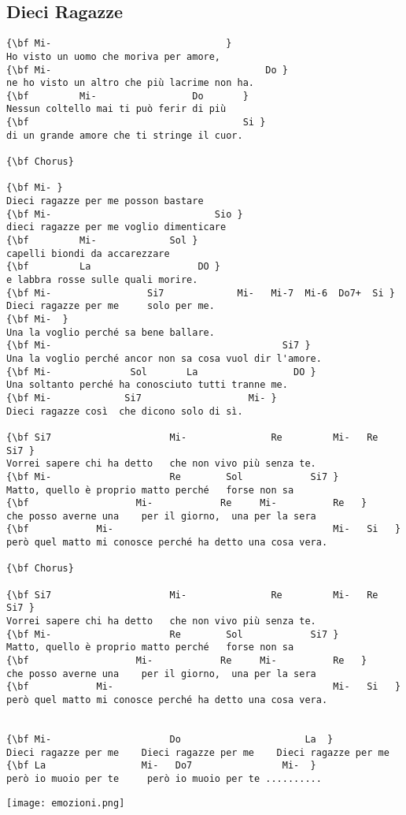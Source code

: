 \documentclass[a4paper]{article}
\begin{document}
\subsection{Dieci Ragazze} %
\label{sub:Dieci Ragazze}
\begin{Verbatim}[commandchars=\\\{\}]
{\bf Mi-                               }
Ho visto un uomo che moriva per amore, 
{\bf Mi-                                      Do }
ne ho visto un altro che più lacrime non ha. 
{\bf         Mi-                 Do       }
Nessun coltello mai ti può ferir di più 
{\bf                                      Si }
di un grande amore che ti stringe il cuor. 

{\bf Chorus}

{\bf Mi- }
Dieci ragazze per me posson bastare 
{\bf Mi-                             Sio }
dieci ragazze per me voglio dimenticare 
{\bf         Mi-             Sol }
capelli biondi da accarezzare 
{\bf         La                   DO }
e labbra rosse sulle quali morire. 
{\bf Mi-                 Si7             Mi-   Mi-7  Mi-6  Do7+  Si }
Dieci ragazze per me     solo per me. 
{\bf Mi-  }
Una la voglio perché sa bene ballare. 
{\bf Mi-                                         Si7 }
Una la voglio perché ancor non sa cosa vuol dir l'amore. 
{\bf Mi-              Sol       La                 DO }
Una soltanto perché ha conosciuto tutti tranne me. 
{\bf Mi-             Si7                   Mi- }
Dieci ragazze così  che dicono solo di sì. 

{\bf Si7                     Mi-               Re         Mi-   Re  Si7 }
Vorrei sapere chi ha detto   che non vivo più senza te. 
{\bf Mi-                     Re        Sol            Si7 }
Matto, quello è proprio matto perché   forse non sa 
{\bf                   Mi-            Re     Mi-          Re   }
che posso averne una    per il giorno,  una per la sera 
{\bf            Mi-                                       Mi-   Si   }
però quel matto mi conosce perché ha detto una cosa vera.   

{\bf Chorus}

{\bf Si7                     Mi-               Re         Mi-   Re  Si7 }
Vorrei sapere chi ha detto   che non vivo più senza te. 
{\bf Mi-                     Re        Sol            Si7 }
Matto, quello è proprio matto perché   forse non sa 
{\bf                   Mi-            Re     Mi-          Re   }
che posso averne una    per il giorno,  una per la sera 
{\bf            Mi-                                       Mi-   Si   }
però quel matto mi conosce perché ha detto una cosa vera.    


{\bf Mi-                     Do                      La  }
Dieci ragazze per me    Dieci ragazze per me    Dieci ragazze per me   
{\bf La                 Mi-   Do7                Mi-  }
però io muoio per te     però io muoio per te ..........
\end{Verbatim}
\newpage
\vspace{14cm}
\centerline{\texttt{[image: emozioni.png]}}
\newpage
\end{document}
